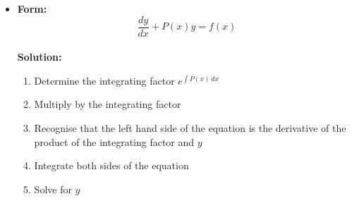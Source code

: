 \documentclass{article}
\begin{document}
\begin{itemize}
  \item \textbf{Form:} \[\frac{d y}{d x} + P(x) y = f(x)\] \\ \textbf{Solution:}

        \begin{enumerate}
          \item Determine the integrating factor $e^{\int P(x) \,d x}$

          \item Multiply by the integrating factor

          \item Recognise that the left hand side of the equation is the derivative of the product of the integrating factor and $y$

          \item Integrate both sides of the equation

          \item Solve for $y$
        \end{enumerate}
\end{itemize}
\end{document}
